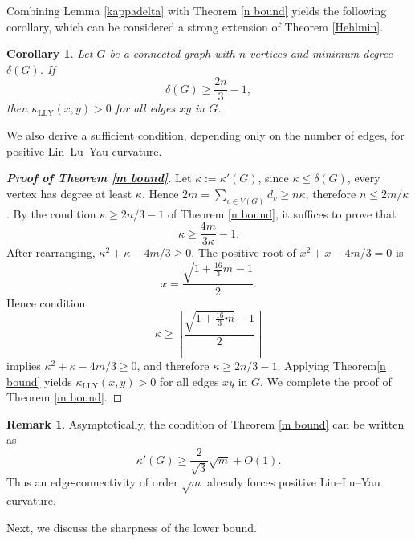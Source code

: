 \documentclass[10pt,a4paper]{article}
\newtheorem{cor}{Corollary}[section]
\theoremstyle{definition}
\newtheorem{remark}{Remark}
\theoremstyle{definition}
\theoremstyle{nonumber}
\newtheorem*{theorem*}{Theorem}
\begin{document}
Combining Lemma \ref{kappadelta} with Theorem \ref{n bound} yields the following corollary, which can be considered a strong extension of Theorem \ref{Hehlmin}.

\begin{cor}
Let $G$ be a connected graph with $n$ vertices and minimum degree $\delta(G)$. If$$\delta(G)\geq \frac{2n}{3}-1,$$ then $\kappa_{\mathrm{LLY}}(x,y)>0$ for all edges $xy$ in $G$.    
\end{cor}

We also derive a sufficient condition, depending only on the number of edges, for positive Lin--Lu--Yau curvature.


\begin{proof}[\bf{Proof of Theorem \ref{m bound}}]
Let $\kappa:=\kappa'(G)$, since $\kappa\leq \delta(G)$, every vertex has degree at least $\kappa$.
Hence $2m=\sum_{v\in V(G)} d_v \geq n\kappa$,
therefore $n\leq 2m/\kappa$.
By the condition $\kappa\geq 2n/3-1$ of Theorem \ref{n bound}, it suffices to prove that
$$\kappa\geq \frac{4m}{3\kappa}-1.$$
After rearranging, $\kappa^2+\kappa-4m/3\geq 0.$
The positive root of $x^2+x-4m/3=0$ is
$$x=\frac{\sqrt{1+\frac{16}{3}m}-1}{2}.$$
Hence condition
$$
\kappa\geq \left\lceil
\frac{\sqrt{1+\frac{16}{3}m}-1}{2}
\right\rceil
$$
implies $\kappa^2+\kappa-4m/3\geq 0$, and therefore $\kappa\geq 2n/3-1$.
Applying Theorem\ref{n bound} yields $\kappa_{\mathrm{LLY}}(x,y)>0$
for all edges $xy$ in $G$. We complete the proof of Theorem \ref{m bound}. 
\end{proof}

\begin{remark}
Asymptotically, the condition of
Theorem \ref{m bound} can be written as
$$
\kappa'(G)\geq \frac{2}{\sqrt3}\sqrt m + O(1).
$$
Thus an edge-connectivity of order $\sqrt m$
already forces positive Lin--Lu--Yau curvature.
\end{remark}

Next, we discuss the sharpness of the lower bound.

\end{document}
